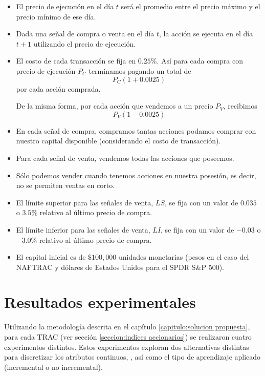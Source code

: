 \documentclass[12pt]{report}
\theoremstyle{break}
\theoremstyle{break}
\begin{document}
\begin{itemize}
\item El precio de ejecución en el día $t$ será el promedio entre el precio máximo y el precio mínimo de ese día.

\item Dada una señal de compra o venta en el día $t$, la acción se ejecuta en el día $t+1$ utilizando el precio de ejecución.

\item El costo de cada transacción se fija en $0.25\%$. Así para cada compra con precio de ejecución $P_{C}$ terminamos pagando un total de 
$$P_{C}(1 + 0.0025)$$
por cada acción comprada.

De la misma forma, por cada acción que vendemos a un precio $P_{V}$, recibimos 
$$P_{V}(1 - 0.0025)$$

\item En cada señal de compra, compramos tantas acciones podamos comprar con nuestro capital disponible (considerando el costo de transacción).

\item Para cada señal de venta, vendemos todas las acciones que poseemos.

\item Sólo podemos vender cuando tenemos acciones en nuestra posesión, es decir, no se permiten ventas en corto.

\item El límite superior para las señales de venta, $LS$, se fija con un valor de $0.035$ o $3.5\%$ relativo al último precio de compra.

\item El límite inferior para las señales de venta, $LI$, se fija con un valor de $-0.03$ o $-3.0\%$ relativo al último precio de compra.

\item El capital inicial es de $\$100,000$ unidades monetarias (pesos en el caso del NAFTRAC y dólares de Estados Unidos para el SPDR S\&P 500).
\end{itemize}

\chapter[Capítulo \thechapter: Resultados experimentales]{Resultados experimentales}
\label{capitulo:resultados experimentales}
Utilizando la metodología descrita en el capítulo \ref{capitulo:solucion propuesta}, para cada TRAC (ver sección \ref{seccion:indices accionarios}) se realizaron cuatro experimentos distintos. Estos experimentos exploran dos alternativas distintas para discretizar los atributos continuos, \cite{dataMiningUsingR}, así como el tipo de aprendizaje aplicado (incremental o no incremental).
\end{document}
